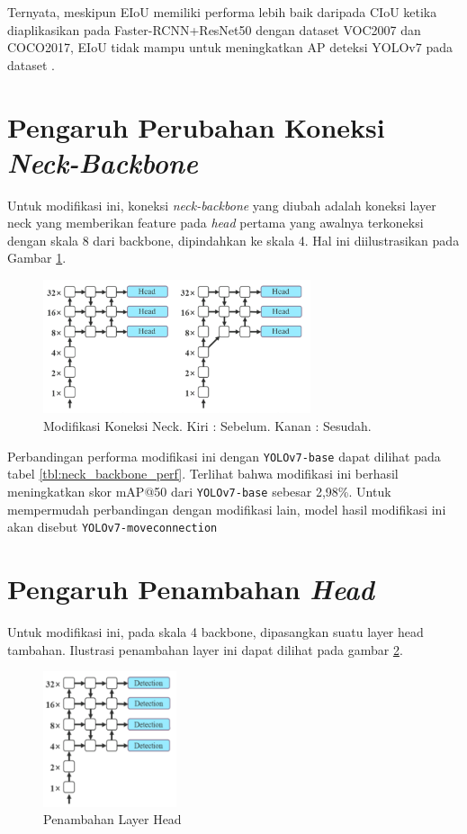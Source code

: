 

Ternyata, meskipun EIoU memiliki performa lebih baik daripada CIoU ketika diaplikasikan
pada Faster-RCNN+ResNet50 dengan dataset VOC2007 dan COCO2017, EIoU tidak mampu untuk meningkatkan
AP deteksi YOLOv7 pada dataset \textcite{aot_dataset}.

\section{Pengaruh Perubahan Koneksi \emph{Neck-Backbone}}
Untuk modifikasi ini, koneksi \emph{neck-backbone} yang diubah adalah
koneksi layer neck yang memberikan feature pada \emph{head} pertama yang
awalnya terkoneksi dengan skala 8 dari backbone, dipindahkan ke skala 4.
Hal ini diilustrasikan pada Gambar \ref{fig:deeperconn}.

\begin{figure}[H]
  \centering
  \includegraphics[width=0.7\textwidth]{figures/deeperconn.png}
  \caption{Modifikasi Koneksi Neck. Kiri : Sebelum. Kanan : Sesudah.}
  \label{fig:deeperconn}
\end{figure}

Perbandingan performa modifikasi ini dengan \verb*|YOLOv7-base| dapat dilihat pada tabel \ref{tbl:neck_backbone_perf}.
Terlihat bahwa modifikasi ini berhasil meningkatkan skor mAP@50
dari \verb*|YOLOv7-base| sebesar 2,98\%. Untuk mempermudah perbandingan dengan modifikasi lain, model hasil modifikasi
ini akan disebut \verb*|YOLOv7-moveconnection|
\vspace{2ex}

\section{Pengaruh Penambahan \emph{Head}}
Untuk modifikasi ini, pada skala 4 backbone, dipasangkan suatu layer head tambahan.
Ilustrasi penambahan layer ini dapat dilihat pada gambar \ref{fig:addinghead}.
\begin{figure}[H]
  \centering
  \includegraphics[width=0.35\textwidth]{figures/addhead.png}
  \caption{Penambahan Layer Head}
  \label{fig:addinghead}
\end{figure}

